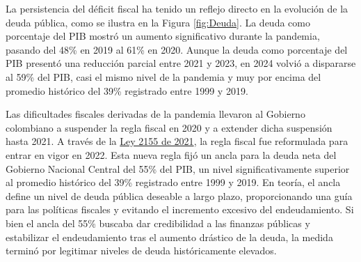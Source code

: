 


La persistencia del déficit fiscal ha tenido un reflejo directo en la evolución de la deuda pública, como se ilustra en la Figura \ref{fig:Deuda}. La deuda como porcentaje del PIB mostró un aumento significativo durante la pandemia, pasando del 48\% en 2019 al 61\% en 2020. Aunque la deuda como porcentaje del PIB presentó una reducción parcial entre  2021 y 2023, en 2024 volvió a dispararse al 59\% del PIB, casi el mismo nivel de la pandemia y muy por encima del promedio histórico del 39\% registrado entre 1999 y 2019.

Las dificultades fiscales derivadas de la pandemia llevaron al Gobierno colombiano a suspender la regla fiscal en 2020 y a extender dicha suspensión hasta 2021. A través de la \href{https://www.funcionpublica.gov.co/eva/gestornormativo/norma.php?i=170902}{Ley 2155 de 2021}, la regla fiscal fue reformulada para entrar en vigor en 2022. Esta nueva regla fijó un ancla para la deuda neta del Gobierno Nacional Central del 55\% del PIB, un nivel significativamente superior al promedio histórico del 39\% registrado entre 1999 y 2019. En teoría, el ancla define un nivel de deuda pública deseable a largo plazo, proporcionando una guía para las políticas fiscales y evitando el incremento excesivo del endeudamiento. Si bien el ancla del 55\% buscaba dar credibilidad a las finanzas públicas y estabilizar el endeudamiento tras el aumento drástico de la deuda, la medida terminó por legitimar niveles de deuda históricamente elevados. 



